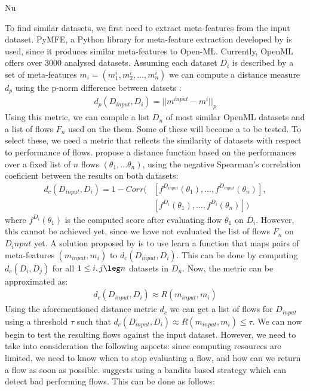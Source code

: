 Nu\documentclass[11pt,twoside, a4paper]{report}
\begin{document}
To find similar datasets, we first need to extract meta-features from the input dataset. PyMFE, a Python library for meta-feature extraction developed by \cite{Rivolli2018} is used, since it produces similar meta-features to Open-ML. Currently, OpenML offers over 3000 analysed datasets. Assuming each dataset $D_i$ is described by a set of meta-features $m_i=(m_1^i, m_2^i, ..., m_n^i)$ we can compute a distance measure $d_p$ using the p-norm difference between datsets \cite{Feurer2019}:
\begin{align*}
    d_p(D_{input}, D_i) = ||m^{input} - m^i ||_p
\end{align*}
Using this metric, we can compile a list $D_n$ of most similar OpenML datasets and a list of flows $F_n$ used on the them. Some of these will become a  to be tested. To select these, we need a metric that reflects the similarity of datasets with respect to performance of flows. 
\cite{Shang2019a} propose a distance function based on the performances over a fixed list of $n$ flows $(\theta_1, ... \theta_n)$, using the negative Spearman's correlation coeficient between the results on both datasets:
\begin{align*}
    d_c(D_{input}, D_i) = 1 - Corr(&[f^{D_{input}}(\theta_1), ... ,f^{D_{input}}(\theta_n)], \\
                                   &[f^{D_{i}}(\theta_1), ... ,f^{D_{i}}(\theta_n)] )
\end{align*}
where $f^{D_{i}}(\theta_1)$ is the computed score after evaluating flow $\theta_1$ on $D_i$. However, this cannot be achieved yet, since we have not evaluated the list of flows $F_n$ on $D_input$ yet. A solution proposed by \cite{Feurer2015a} is to use learn a function that maps pairs of meta-features $(m_{input}, m_i)$ to $d_c(D_{input}, D_i)$. This can be done by computing $d_c(D_i, D_j)$ for all $1 \leq i,j \leg n$ datasets in $D_n$. Now, the metric can be approximated as:
\begin{align*}
    d_c(D_{input}, D_i) \approx R(m_{input}, m_i)
\end{align*}
Using the aforementioned distance metric $d_c$ we can get a list of flows for $D_{input}$ using a threshold $\tau$ such that $d_c(D_{input}, D_i) \approx R(m_{input}, m_i) \leq \tau$. 
We can now begin to test the resulting flows against the input dataset. However, we need to take into consideration the following aspects: since computing resources are limited, we need to know when to stop evaluating a flow, and how can we return a flow as soon as possible. \cite{Shang2019a} suggests using a bandits based strategy which can detect bad performing flows. This can be done as follows:
\end{document}
